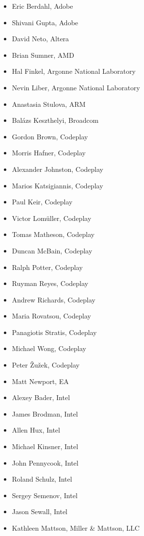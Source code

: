 \begin{multicols}{2}
\begin{itemize}
\item
    Eric Berdahl, Adobe
\item
    Shivani Gupta, Adobe
\item
    David Neto, Altera
\item
    Brian Sumner, AMD
\item
    Hal Finkel, Argonne National Laboratory
\item
    Nevin Liber, Argonne National Laboratory
\item
    Anastasia Stulova, ARM
\item
    Bal\'azs Keszthelyi, Broadcom
\item
    Gordon Brown, Codeplay
\item
    Morris Hafner, Codeplay
\item
    Alexander Johnston, Codeplay
\item
    Marios Katsigiannis, Codeplay
\item
    Paul Keir, Codeplay
\item
    Victor Lom\"uller, Codeplay
\item
    Tomas Matheson, Codeplay
\item
    Duncan McBain, Codeplay
\item
    Ralph Potter, Codeplay
\item
    Ruyman Reyes, Codeplay
\item
    Andrew Richards, Codeplay
\item
    Maria Rovatsou, Codeplay
\item
    Panagiotis Stratis, Codeplay
\item
    Michael Wong, Codeplay
\item
    Peter {\v Z}u{\v z}ek, Codeplay
\item
    Matt Newport, EA
\item
    Alexey Bader, Intel
\item
    James Brodman, Intel
\item
    Allen Hux, Intel
\item
    Michael Kinsner, Intel
\item
    John Pennycook, Intel
\item
    Roland Schulz, Intel
\item
    Sergey Semenov, Intel
\item
    Jason Sewall, Intel
\item
    Kathleen Mattson, Miller \& Mattson, LLC

\end{itemize}
\end{multicols}

